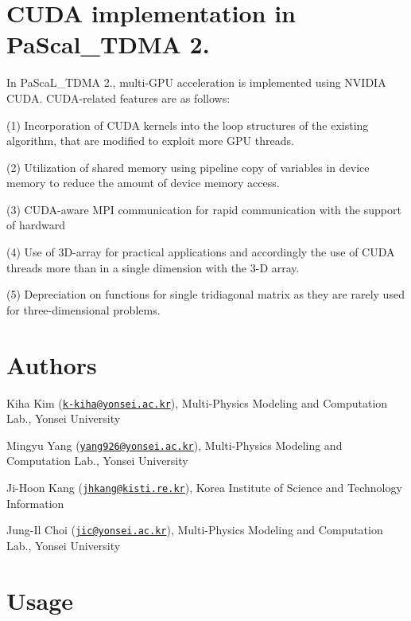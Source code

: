 \section*{C\+U\+DA implementation in Pa\+Scal\+\_\+\+T\+D\+MA 2.}

In Pa\+Sca\+L\+\_\+\+T\+D\+MA 2., multi-\/\+G\+PU acceleration is implemented using N\+V\+I\+D\+IA C\+U\+DA. C\+U\+D\+A-\/related features are as follows\+:
\begin{DoxyItemize}
\item (1) Incorporation of C\+U\+DA kernels into the loop structures of the existing algorithm, that are modified to exploit more G\+PU threads.
\item (2) Utilization of shared memory using pipeline copy of variables in device memory to reduce the amount of device memory access.
\item (3) C\+U\+D\+A-\/aware M\+PI communication for rapid communication with the support of hardward
\item (4) Use of 3\+D-\/array for practical applications and accordingly the use of C\+U\+DA threads more than in a single dimension with the 3-\/D array.
\item (5) Depreciation on functions for single tridiagonal matrix as they are rarely used for three-\/dimensional problems.
\end{DoxyItemize}

\section*{Authors}


\begin{DoxyItemize}
\item Kiha Kim (\href{mailto:k-kiha@yonsei.ac.kr}{\tt k-\/kiha@yonsei.\+ac.\+kr}), Multi-\/\+Physics Modeling and Computation Lab., Yonsei University
\item Mingyu Yang (\href{mailto:yang926@yonsei.ac.kr}{\tt yang926@yonsei.\+ac.\+kr}), Multi-\/\+Physics Modeling and Computation Lab., Yonsei University
\item Ji-\/\+Hoon Kang (\href{mailto:jhkang@kisti.re.kr}{\tt jhkang@kisti.\+re.\+kr}), Korea Institute of Science and Technology Information
\item Jung-\/\+Il Choi (\href{mailto:jic@yonsei.ac.kr}{\tt jic@yonsei.\+ac.\+kr}), Multi-\/\+Physics Modeling and Computation Lab., Yonsei University
\end{DoxyItemize}

\section*{Usage}

